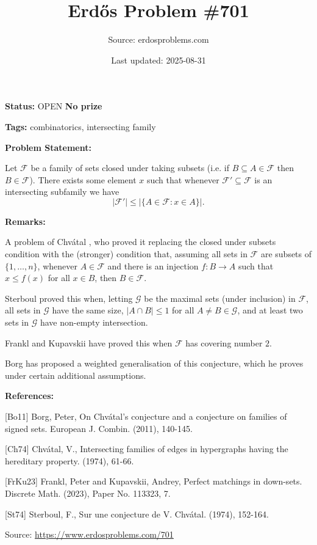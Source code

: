 \documentclass{article}
\title{Erd\H{o}s Problem \#701}
\date{Last updated: 2025-08-31}
\author{Source: erdosproblems.com}
\begin{document}
\maketitle

\noindent\textbf{Status:} OPEN \quad \textbf{No prize}

\noindent\textbf{Tags:} combinatorics, intersecting family

\medskip
\noindent\textbf{Problem Statement:}

Let $\mathcal{F}$ be a family of sets closed under taking subsets (i.e. if $B\subseteq A\in\mathcal{F}$ then $B\in \mathcal{F}$). There exists some element $x$ such that whenever $\mathcal{F}'\subseteq \mathcal{F}$ is an intersecting subfamily we have\[\lvert \mathcal{F}'\rvert \leq \lvert \{ A\in \mathcal{F} : x\in A\}\rvert.\]

\bigskip
\noindent\textbf{Remarks:}

A problem of Chv\'{a}tal \cite{Ch74}, who proved it replacing the closed under subsets condition with the (stronger) condition that, assuming all sets in $\mathcal{F}$ are subsets of $\{1,\ldots,n\}$, whenever $A\in \mathcal{F}$ and there is an injection $f:B\to A$ such that $x\leq f(x)$ for all $x\in B$, then $B\in \mathcal{F}$.

Sterboul \cite{St74} proved this when, letting $\mathcal{G}$ be the maximal sets (under inclusion) in $\mathcal{F}$, all sets in $\mathcal{G}$ have the same size, $\lvert A\cap B\rvert\leq 1$ for all $A\neq B\in \mathcal{G}$, and at least two sets in $\mathcal{G}$ have non-empty intersection.

Frankl and Kupavskii \cite{FrKu23} have proved this when $\mathcal{F}$ has covering number $2$.

Borg \cite{Bo11} has proposed a weighted generalisation of this conjecture, which he proves under certain additional assumptions.

\bigskip
\noindent\textbf{References:}

[Bo11] Borg, Peter, On Chv\'{a}tal's conjecture and a conjecture on families of
signed sets. European J. Combin. (2011), 140-145.
 
 [Ch74] Chv\'{a}tal, V., Intersecting families of edges in hypergraphs having the
hereditary property. (1974), 61-66.
 
 [FrKu23] Frankl, Peter and Kupavskii, Andrey, Perfect matchings in down-sets. Discrete Math. (2023), Paper No. 113323, 7.
 
 [St74] Sterboul, F., Sur une conjecture de V. Chv\'{a}tal. (1974), 152-164.

\bigskip
\noindent\small{Source: \url{https://www.erdosproblems.com/701}}
\end{document}

